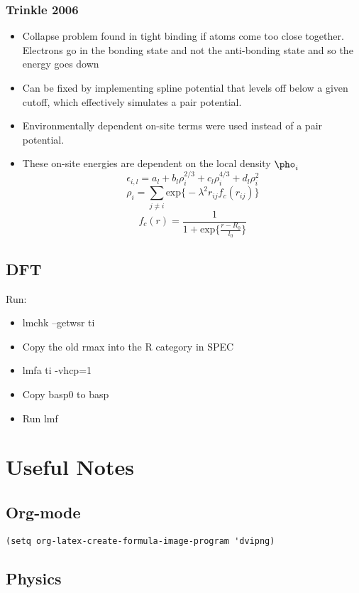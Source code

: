 \documentclass[11pt]{article}
\begin{document}
\subsubsection{Trinkle 2006}
\label{sec-2-5-1}
\begin{itemize}
\item Collapse problem found in tight binding if atoms come too close
together. Electrons go in the bonding state and not the anti-bonding
state and so the energy goes down
\item Can be fixed by implementing spline potential that levels off below a
given cutoff, which effectively simulates a pair potential.
\item Environmentally dependent on-site terms were used instead of a pair potential.
\item These on-site energies are dependent on the local density $\pho_{i}$ \[
      \epsilon_{i,l} = a_{l} + b_{l}\rho_{i}^{2/3} + c_{l}\rho_{i}^{4/3} +
      d_{l}\rho_{i}^{2}\] 
      \[ \rho_{i} = \sum_{j \neq i} \text{exp}\big\{ -\lambda^{2} r_{ij}
      f_{c}(r_{ij}) \big\} \]
      \[ f_{c}(r) = \frac{1}{1 + \text{exp}\Big\{  \frac{r-R_{0}}{l_{0}}\Big\}
      }\]
\end{itemize}
\subsection{DFT}
\label{sec-2-6}
Run:
\begin{itemize}
\item lmchk --getwsr ti
\item Copy the old rmax into the R category in SPEC
\item lmfa ti -vhcp=1
\item Copy basp0 to basp
\item Run lmf
\end{itemize}

\section{Useful Notes}
\label{sec-3}
\subsection{Org-mode}
\label{sec-3-1}
\begin{verbatim}
(setq org-latex-create-formula-image-program 'dvipng)
\end{verbatim}

\subsection{Physics}
\label{sec-3-2}
\end{document}
